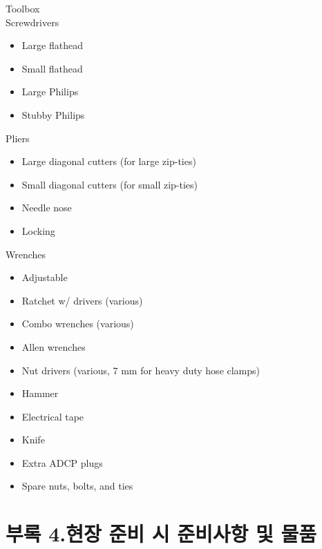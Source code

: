 \documentclass[
]{book}
\providecommand{\tightlist}{%
  \setlength{\itemsep}{0pt}\setlength{\parskip}{0pt}}
\begin{document}
Toolbox\\
Screwdrivers

\begin{itemize}
\tightlist
\item
  Large flathead\\
\item
  Small flathead\\
\item
  Large Philips\\
\item
  Stubby Philips
\end{itemize}

Pliers

\begin{itemize}
\tightlist
\item
  Large diagonal cutters (for large zip-ties)\\
\item
  Small diagonal cutters (for small zip-ties)\\
\item
  Needle nose\\
\item
  Locking
\end{itemize}

Wrenches

\begin{itemize}
\tightlist
\item
  Adjustable\\
\item
  Ratchet w/ drivers (various)\\
\item
  Combo wrenches (various)\\
\item
  Allen wrenches\\
\item
  Nut drivers (various, 7 mm for heavy duty hose clamps)\\
\item
  Hammer\\
\item
  Electrical tape\\
\item
  Knife\\
\item
  Extra ADCP plugs\\
\item
  Spare nuts, bolts, and ties
\end{itemize}

\hypertarget{uxbd80uxb85d-4.uxd604uxc7a5-uxc900uxbe44-uxc2dc-uxc900uxbe44uxc0acuxd56d-uxbc0f-uxbb3cuxd488}{%
\section{부록 4.현장 준비 시 준비사항 및 물품}\label{uxbd80uxb85d-4.uxd604uxc7a5-uxc900uxbe44-uxc2dc-uxc900uxbe44uxc0acuxd56d-uxbc0f-uxbb3cuxd488}}
\end{document}
